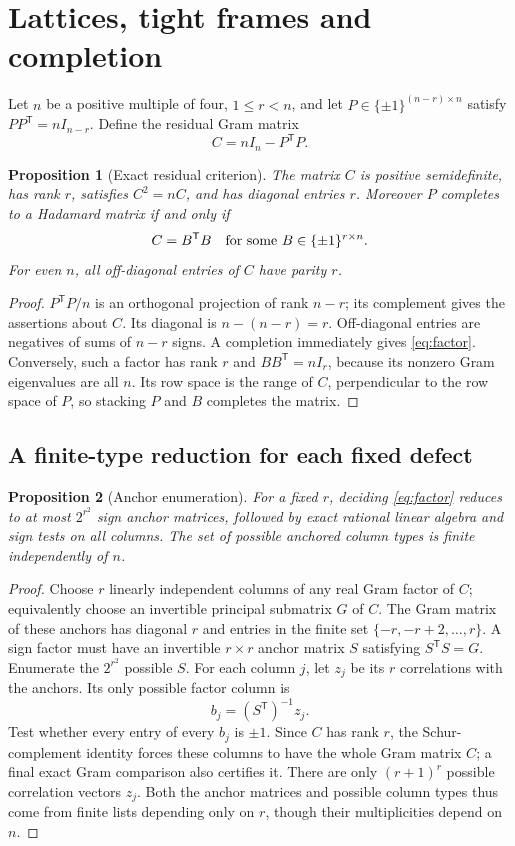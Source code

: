\documentclass[11pt]{article}
\newtheorem{proposition}{Proposition}[section]
\begin{document}
\section{Lattices, tight frames and completion}
Let $n$ be a positive multiple of four, $1\le r<n$, and let
$P\in\{\pm1\}^{(n-r)\times n}$ satisfy
$PP^{\mathsf T}=nI_{n-r}$. Define the residual Gram matrix
\[
 C=nI_n-P^{\mathsf T}P.
\]
\begin{proposition}[Exact residual criterion]\label{prop:residual}
The matrix $C$ is positive semidefinite, has rank $r$, satisfies
$C^2=nC$, and has diagonal entries $r$. Moreover $P$ completes to a
Hadamard matrix if and only if
\begin{equation}\label{eq:factor}
 C=B^{\mathsf T}B\quad\hbox{for some }B\in\{\pm1\}^{r\times n}.
\end{equation}
For even $n$, all off-diagonal entries of $C$ have parity $r$.
\end{proposition}
\begin{proof}
$P^{\mathsf T}P/n$ is an orthogonal projection of rank $n-r$; its
complement gives the assertions about $C$. Its diagonal is
$n-(n-r)=r$. Off-diagonal entries are negatives of sums of $n-r$
signs. A completion immediately gives \eqref{eq:factor}. Conversely,
such a factor has rank $r$ and $BB^{\mathsf T}=nI_r$, because its
nonzero Gram eigenvalues are all $n$. Its row space is the range of
$C$, perpendicular to the row space of $P$, so stacking $P$ and $B$
completes the matrix.
\end{proof}

\subsection{A finite-type reduction for each fixed defect}
\begin{proposition}[Anchor enumeration]\label{prop:anchor}
For a fixed $r$, deciding \eqref{eq:factor} reduces to at most
$2^{r^2}$ sign anchor matrices, followed by exact rational linear
algebra and sign tests on all columns. The set of possible anchored
column types is finite independently of $n$.
\end{proposition}
\begin{proof}
Choose $r$ linearly independent columns of any real Gram factor of
$C$; equivalently choose an invertible principal submatrix $G$ of $C$.
The Gram matrix of these anchors has diagonal $r$ and entries in the
finite set $\{-r,-r+2,\ldots,r\}$. A sign factor must have an
invertible $r\times r$ anchor matrix $S$ satisfying $S^{\mathsf T}S=G$.
Enumerate the $2^{r^2}$ possible $S$. For each column $j$, let $z_j$
be its $r$ correlations with the anchors. Its only possible factor
column is
\[
 b_j=(S^{\mathsf T})^{-1}z_j.
\]
Test whether every entry of every $b_j$ is $\pm1$. Since $C$ has rank
$r$, the Schur-complement identity forces these columns to have the
whole Gram matrix $C$; a final exact Gram comparison also certifies it.
There are only $(r+1)^r$ possible correlation vectors $z_j$. Both the
anchor matrices and possible column types thus come from finite lists
depending only on $r$, though their multiplicities depend on $n$.
\end{proof}
\end{document}
